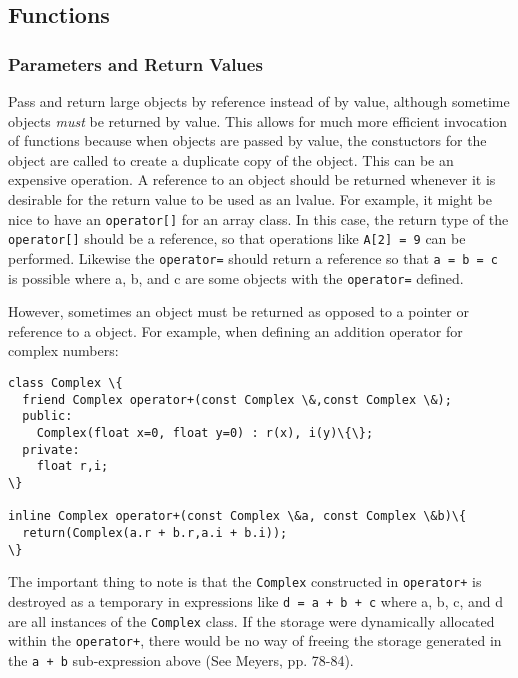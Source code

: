 \subsection{Functions}
\subsubsection{Parameters and Return Values}
Pass and return large objects by reference instead of by value, although
sometime objects \emph{must} be returned by value. This allows for much more efficient 
invocation of functions because when objects are passed by value, the constuctors 
for the object are called to create a duplicate copy of the object. This can be an 
expensive operation. A reference to an object should be returned whenever 
it is desirable for the return value to be used as an lvalue. For example,
it might be nice to have an \texttt{operator[]} for an array class. In this case,
the return type of the \texttt{operator[]} should be a reference, so that operations 
like \texttt{A[2] = 9} can be performed. Likewise the \texttt{operator=} should
return a reference so that \texttt{a = b = c} is possible where a, b, and
c are some objects with the \texttt{operator=} defined.

However, sometimes an object must be returned as opposed to a pointer or
reference to a object. For example, when defining an addition operator for
complex numbers:
\begin{verbatim}
class Complex \{
  friend Complex operator+(const Complex \&,const Complex \&);
  public:
    Complex(float x=0, float y=0) : r(x), i(y)\{\};
  private:
    float r,i;
\}

inline Complex operator+(const Complex \&a, const Complex \&b)\{
  return(Complex(a.r + b.r,a.i + b.i));
\}
\end{verbatim}
\noindent
The important thing to note is that the \texttt{Complex} constructed in
\texttt{operator+} is destroyed as a temporary in expressions like 
\texttt{d = a + b + c} where a, b, c, and d are all instances of the 
\texttt{Complex} class. If the storage were dynamically allocated
within the \texttt{operator+}, there would be no way of freeing the 
storage generated in the \texttt{a + b} sub-expression above 
(See Meyers, pp. 78-84). 

